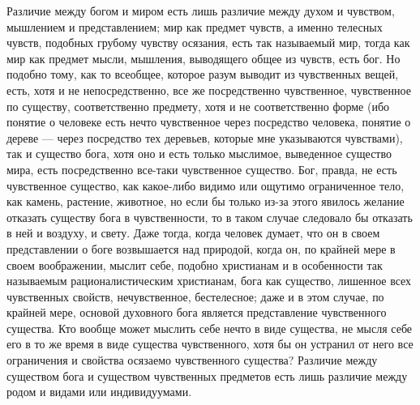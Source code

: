 \documentclass[12pt]{article}
\begin{document}
Различие между богом и миром есть лишь различие между духом и чувством, мышлением и представлением; мир как предмет чувств, а именно телесных чувств, подобных грубому чувству осязания, есть так называемый мир, тогда как мир как предмет мысли, мышления, выводящего общее из чувств, есть бог. Но подобно тому, как то всеобщее, которое разум выводит из чувственных вещей, есть, хотя и не непосредственно, все же посредственно чувственное, чувственное по существу, соответственно предмету, хотя и не соответственно форме (ибо понятие о человеке есть нечто чувственное через посредство человека, понятие о дереве --- через посредство тех деревьев, которые мне указываются чувствами), так и существо бога, хотя оно и есть только мыслимое, выведенное существо мира, есть посредственно все-таки чувственное существо. Бог, правда, не есть чувственное существо, как какое-либо видимо или ощутимо ограниченное тело, как камень, растение, животное, но если бы только из-за этого явилось желание отказать существу бога в чувственности, то в таком случае следовало бы отказать в ней и воздуху, и свету. Даже тогда, когда человек думает, что он в своем представлении о боге возвышается над природой, когда он, по крайней мере в своем воображении, мыслит себе, подобно христианам и в особенности так называемым рационалистическим христианам, бога как существо, лишенное всех чувственных свойств, нечувственное, бестелесное; даже и в этом случае, по крайней мере, основой духовного бога является представление чувственного существа. Кто вообще может мыслить себе нечто в виде существа, не мысля себе его в то же время в виде существа чувственного, хотя бы он устранил от него все ограничения и свойства осязаемо чувственного существа? Различие между существом бога и существом чувственных предметов есть лишь различие между родом и видами или индивидуумами. 
\end{document}
